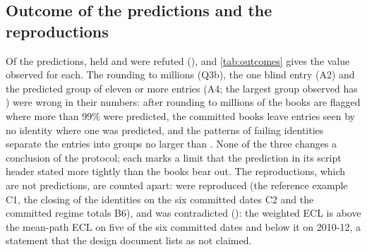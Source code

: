 

\subsection{Outcome of the predictions and the reproductions}
\label{sec:res-hypotheses}

Of the \hypTotal{} predictions, \hypHeld{} held and \hypRefuted{} were refuted (\hypRefutedList{}), and \cref{tab:outcomes} gives the value observed for each.
The rounding to millions (Q3b), the one blind entry (A2) and the predicted group of eleven or more entries (A4; the largest group observed has \esixLargest{}) were wrong in their numbers: after rounding to millions \etwoRoundMillionPct{} of the books are flagged where more than 99\% were predicted, the committed books leave \esixBlind{} entries seen by no identity where one was predicted, and the \esixPatterns{} patterns of failing identities separate the entries into groups no larger than \esixLargest{}.
None of the three changes a conclusion of the protocol; each marks a limit that the prediction in its script header stated more tightly than the books bear out.
The \hypReproTotal{} reproductions, which are not predictions, are counted apart: \hypReproHeld{} were reproduced (the reference example C1, the closing of the identities on the six committed dates C2 and the committed regime totals B6), and \hypReproContradicted{} was contradicted (\hypReproContradictedList{}): the weighted ECL is above the mean-path ECL on five of the six committed dates and below it on 2010-12, a statement that the design document lists as not claimed.


